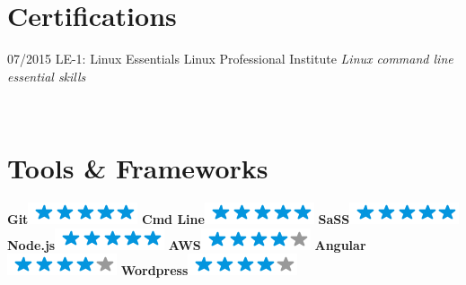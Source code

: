 \documentclass[]{friggeri-cv}
\begin{document}
\section{Certifications}
\begin{entrylist}
  \entry
    {07/2015}
    {LE-1: Linux Essentials}
    {Linux Professional Institute}
    {\emph{Linux command line essential skills}}
\end{entrylist}

\newpage

\begin{aside}
~
~
~
  \section{Tools \& Frameworks}
    \textbf{Git}\includegraphics[scale=0.40]{img/5stars.png}
    \textbf{Cmd Line}\includegraphics[scale=0.40]{img/5stars.png}
    \textbf{SaSS}\includegraphics[scale=0.40]{img/5stars.png}
    \textbf{Node.js}\includegraphics[scale=0.40]{img/5stars.png}
     \textbf{AWS}\includegraphics[scale=0.40]{img/4stars.png}
     \textbf{Angular}\includegraphics[scale=0.40]{img/4stars.png}
      \textbf{Wordpress}\includegraphics[scale=0.40]{img/4stars.png}

\end{aside}
\end{document}
